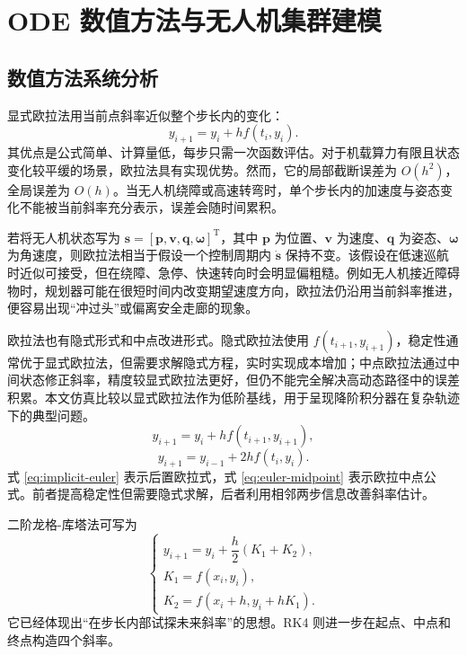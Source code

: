 \documentclass[UTF8,zihao=-4]{ctexart}
\begin{document}
\section{ODE 数值方法与无人机集群建模}

\subsection{数值方法系统分析}

\par
显式欧拉法用当前点斜率近似整个步长内的变化：
\begin{equation}
  y_{i+1}=y_i+h f(t_i,y_i).
  \label{eq:euler}
\end{equation}
其优点是公式简单、计算量低，每步只需一次函数评估。对于机载算力有限且状态变化较平缓的场景，欧拉法具有实现优势。然而，它的局部截断误差为 $O(h^2)$，全局误差为 $O(h)$。当无人机绕障或高速转弯时，单个步长内的加速度与姿态变化不能被当前斜率充分表示，误差会随时间累积。

若将无人机状态写为 $\bm s=[\bm p,\bm v,\bm q,\bm \omega]^\mathrm{T}$，其中 $\bm p$ 为位置、$\bm v$ 为速度、$\bm q$ 为姿态、$\bm \omega$ 为角速度，则欧拉法相当于假设一个控制周期内 $\dot{\bm s}$ 保持不变。该假设在低速巡航时近似可接受，但在绕障、急停、快速转向时会明显偏粗糙。例如无人机接近障碍物时，规划器可能在很短时间内改变期望速度方向，欧拉法仍沿用当前斜率推进，便容易出现“冲过头”或偏离安全走廊的现象。

欧拉法也有隐式形式和中点改进形式。隐式欧拉法使用 $f(t_{i+1},y_{i+1})$，稳定性通常优于显式欧拉法，但需要求解隐式方程，实时实现成本增加；中点欧拉法通过中间状态修正斜率，精度较显式欧拉法更好，但仍不能完全解决高动态路径中的误差积累。本文仿真比较以显式欧拉法作为低阶基线，用于呈现降阶积分器在复杂轨迹下的典型问题。
\begin{equation}
  y_{i+1}=y_i+h f(t_{i+1},y_{i+1}),
  \label{eq:implicit-euler}
\end{equation}
\begin{equation}
  y_{i+1}=y_{i-1}+2h f(t_i,y_i).
  \label{eq:euler-midpoint}
\end{equation}
式 \eqref{eq:implicit-euler} 表示后置欧拉式，式 \eqref{eq:euler-midpoint} 表示欧拉中点公式。前者提高稳定性但需要隐式求解，后者利用相邻两步信息改善斜率估计。

\par
二阶龙格-库塔法可写为
\begin{equation}
\begin{cases}
  y_{i+1}=y_i+\dfrac{h}{2}(K_1+K_2),\\
  K_1=f(x_i,y_i),\\
  K_2=f(x_i+h,y_i+hK_1).
\end{cases}
\label{eq:rk2}
\end{equation}
它已经体现出“在步长内部试探未来斜率”的思想。RK4 则进一步在起点、中点和终点构造四个斜率。
\end{document}
